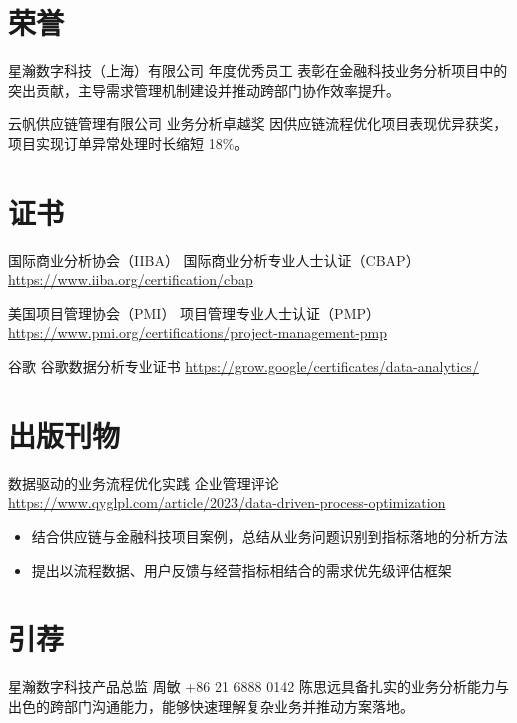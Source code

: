 \documentclass[a4paper, serif, 10pt]{moderncv}
\begin{document}
\section{荣誉}

        {星瀚数字科技（上海）有限公司}
        {年度优秀员工}
        {}
        {}
        {表彰在金融科技业务分析项目中的突出贡献，主导需求管理机制建设并推动跨部门协作效率提升。}

        {云帆供应链管理有限公司}
        {业务分析卓越奖}
        {}
        {}
        {因供应链流程优化项目表现优异获奖，项目实现订单异常处理时长缩短 18\%。}
\section{证书}

        {国际商业分析协会（IIBA）}
        {国际商业分析专业人士认证（CBAP）}
        {\url{https://www.iiba.org/certification/cbap}}
        {}
        {}

        {美国项目管理协会（PMI）}
        {项目管理专业人士认证（PMP）}
        {\url{https://www.pmi.org/certifications/project-management-pmp}}
        {}
        {}

        {谷歌}
        {谷歌数据分析专业证书}
        {\url{https://grow.google/certificates/data-analytics/}}
        {}
        {}
\section{出版刊物}

        {数据驱动的业务流程优化实践}
        {企业管理评论}
        {\url{https://www.qyglpl.com/article/2023/data-driven-process-optimization}}
        {}
        {\begin{itemize}
\item 结合供应链与金融科技项目案例，总结从业务问题识别到指标落地的分析方法
\item 提出以流程数据、用户反馈与经营指标相结合的需求优先级评估框架
\end{itemize}}
\section{引荐}

        {星瀚数字科技产品总监}
        {周敏}
        {+86 21 6888 0142}
        {}
        {陈思远具备扎实的业务分析能力与出色的跨部门沟通能力，能够快速理解复杂业务并推动方案落地。}
\end{document}

